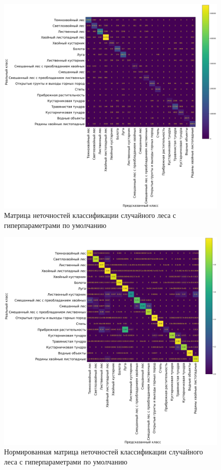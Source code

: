\documentclass[14pt, a4paper, oneside]{extarticle}
\begin{document}
\begin{figure}[H]
    \caption{Матрица неточностей классификации случайного леса с гиперпараметрами по умолчанию}
    \centering
    \includegraphics[scale=0.33]{confusion-matrix-1}
\end{figure}

\begin{figure}[H]
    \caption{Нормированная матрица неточностей классификации случайного леса с гиперпараметрами по умолчанию}
    \centering
    \includegraphics[scale=0.33]{confusion-matrix-2}
\end{figure}
\end{document}
